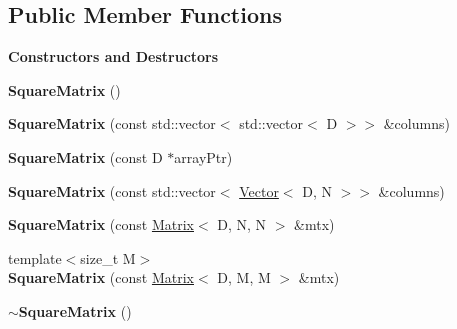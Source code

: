 \subsection*{Public Member Functions}
\begin{Indent}\textbf{ Constructors and Destructors}\par
{\em 
\begin{DoxyItemize}
\item 
\end{DoxyItemize}}\begin{DoxyCompactItemize}
\item 
\mbox{\label{classrev_1_1_square_matrix_a04ebde424115a379c246484eb84f358e}} 
{\bfseries Square\+Matrix} ()
\item 
\mbox{\label{classrev_1_1_square_matrix_a8c16af312baaf791f9bb433280baaa16}} 
{\bfseries Square\+Matrix} (const std\+::vector$<$ std\+::vector$<$ D $>$$>$ \&columns)
\item 
\mbox{\label{classrev_1_1_square_matrix_ac92da3127e97a0f36c94b86e93b17054}} 
{\bfseries Square\+Matrix} (const D $\ast$array\+Ptr)
\item 
\mbox{\label{classrev_1_1_square_matrix_ad8d73793c4aebf5001da1e2080aa9bb6}} 
{\bfseries Square\+Matrix} (const std\+::vector$<$ \mbox{\hyperlink{classrev_1_1_vector}{Vector}}$<$ D, N $>$$>$ \&columns)
\item 
\mbox{\label{classrev_1_1_square_matrix_ab60a486bb0dcfdf0a1478ac9cf376e58}} 
{\bfseries Square\+Matrix} (const \mbox{\hyperlink{classrev_1_1_matrix}{Matrix}}$<$ D, N, N $>$ \&mtx)
\item 
\mbox{\label{classrev_1_1_square_matrix_a32d7bb75aa7b2f7d1e9a172968e3ac58}} 
{\footnotesize template$<$size\+\_\+t M$>$ }\\{\bfseries Square\+Matrix} (const \mbox{\hyperlink{classrev_1_1_matrix}{Matrix}}$<$ D, M, M $>$ \&mtx)
\item 
\mbox{\label{classrev_1_1_square_matrix_a0b14b91d0a480c19658ef1d5f8e9c427}} 
{\bfseries $\sim$\+Square\+Matrix} ()
\end{DoxyCompactItemize}
\end{Indent}
